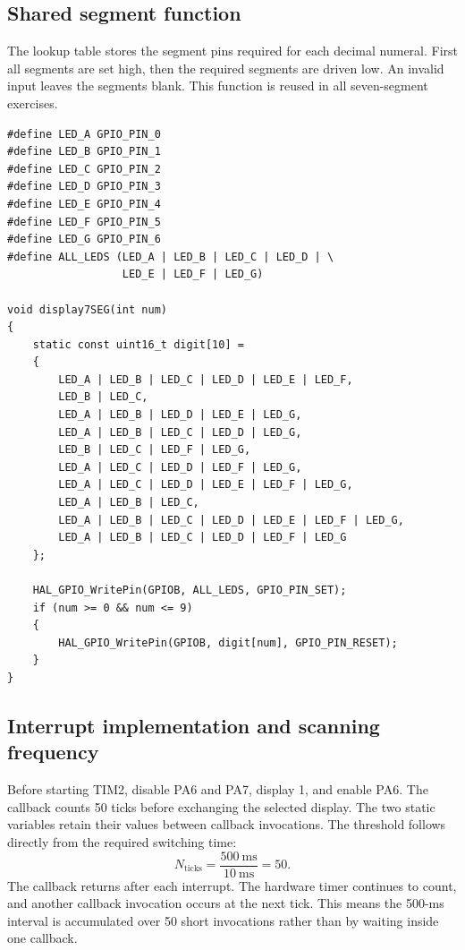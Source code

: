 \documentclass[a4paper]{article}
\newcommand{\topic}[1]{\subsection{#1}}
\begin{document}
\topic{Shared segment function}
The lookup table stores the segment pins required for each decimal numeral.
First all segments are set high, then the required segments are driven low.
An invalid input leaves the segments blank. This function is reused in all
seven-segment exercises.
\par\noindent\begin{minipage}{\linewidth}
\begin{lstlisting}[caption={Segment definitions and decimal conversion}]
#define LED_A GPIO_PIN_0
#define LED_B GPIO_PIN_1
#define LED_C GPIO_PIN_2
#define LED_D GPIO_PIN_3
#define LED_E GPIO_PIN_4
#define LED_F GPIO_PIN_5
#define LED_G GPIO_PIN_6
#define ALL_LEDS (LED_A | LED_B | LED_C | LED_D | \
                  LED_E | LED_F | LED_G)

void display7SEG(int num)
{
    static const uint16_t digit[10] =
    {
        LED_A | LED_B | LED_C | LED_D | LED_E | LED_F,
        LED_B | LED_C,
        LED_A | LED_B | LED_D | LED_E | LED_G,
        LED_A | LED_B | LED_C | LED_D | LED_G,
        LED_B | LED_C | LED_F | LED_G,
        LED_A | LED_C | LED_D | LED_F | LED_G,
        LED_A | LED_C | LED_D | LED_E | LED_F | LED_G,
        LED_A | LED_B | LED_C,
        LED_A | LED_B | LED_C | LED_D | LED_E | LED_F | LED_G,
        LED_A | LED_B | LED_C | LED_D | LED_F | LED_G
    };

    HAL_GPIO_WritePin(GPIOB, ALL_LEDS, GPIO_PIN_SET);
    if (num >= 0 && num <= 9)
    {
        HAL_GPIO_WritePin(GPIOB, digit[num], GPIO_PIN_RESET);
    }
}
\end{lstlisting}
\end{minipage}\par

\topic{Interrupt implementation and scanning frequency}
Before starting TIM2, disable PA6 and PA7, display 1, and enable PA6.
The callback counts 50 ticks before exchanging the selected display.
The two static variables retain their values between callback invocations.
The threshold follows directly from the required switching time:
\[
N_{\mathrm{ticks}}=\frac{500\ \mathrm{ms}}{10\ \mathrm{ms}}=50.
\]
The callback returns after each interrupt. The hardware timer continues to
count, and another callback invocation occurs at the next tick. This means
the 500-ms interval is accumulated over 50 short invocations rather than by
waiting inside one callback.
\end{document}
